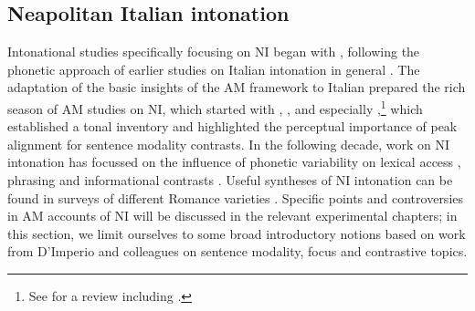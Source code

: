 \subsection{Neapolitan Italian intonation}\label{sec123}
Intonational studies specifically focusing on NI began with \citet{maturi1988intonazione}, following the phonetic approach of earlier studies on Italian intonation in general \citep{magnocaldognetto1978f0}. The adaptation of the basic insights of the AM framework to Italian \citep{avesani1990contribution} prepared the rich season of AM studies on NI, which started with \citet{caputo1994intonazione,caputo1996presupposizione}, \citet{caputo1995possibile}, and especially \citet{dimperio1995timing,dimperio1997narrow,dimperio2001focus,dimperio2003tonal},\footnote{See \citet[§2.1]{dimperio2000role} for a review including \citet{dimperio1996caratteristiche,dimperio1997breadth,dimperio1997perception}.} which established a tonal inventory and highlighted the perceptual importance of peak alignment for sentence modality contrasts. In the following decade, work on NI intonation has focussed on the influence of phonetic variability on lexical access \citep{dimperio2007effects}, phrasing \citep{petrone2008tonal,petrone2011tones,dimperio2011phrasing} and informational contrasts \citep{brunetti2010prosodic}. Useful syntheses of NI intonation can be found in surveys of different Romance varieties \citep{dimperio2002italian,grice2005strategy,prieto2005pitch}. Specific points and controversies in AM accounts of NI will be discussed in the relevant experimental chapters; in this section, we limit ourselves to some broad introductory notions based on work from D'Imperio and colleagues \citep{grice2005strategy,petrone2011tones,dimperio2011phrasing} on sentence modality, focus and contrastive topics.

